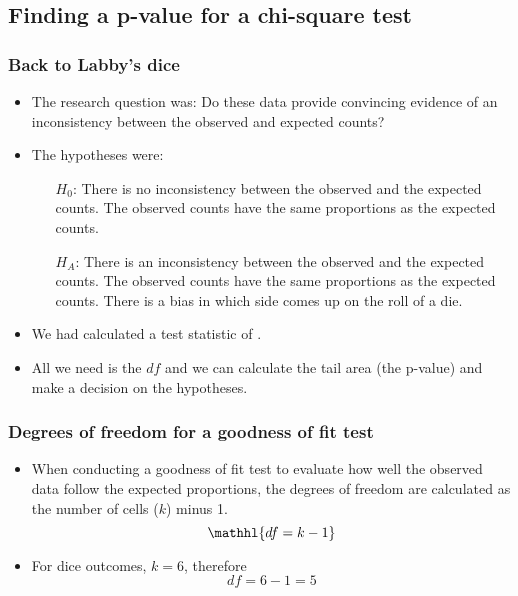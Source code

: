 \documentclass[slidestop,compress,mathserif]{beamer}
\begin{document}

\subsection{Finding a p-value for a chi-square test}


\begin{frame}
\frametitle{Back to Labby's dice}

\begin{itemize}

\item The research question was: Do these data provide convincing evidence of an inconsistency between the observed and expected counts?

\pause

\item The hypotheses were:
\begin{itemize}
\item[$H_0$:] There is no inconsistency between the observed and the expected counts. The observed counts have the same proportions as the expected counts.
\item[$H_A$:] There is an inconsistency between the observed and the expected counts. The observed counts  have the same proportions as the expected counts. There is a bias in which side comes up on the roll of a die.
\end{itemize}

\pause

\item We had calculated a test statistic of .

\pause

\item All we need is the $df$ and we can calculate the tail area (the p-value) and make a decision on the hypotheses.

\end{itemize}

\end{frame}


\begin{frame}
\frametitle{Degrees of freedom for a goodness of fit test}

\begin{itemize}

\item When conducting a goodness of fit test to evaluate how well the observed data follow the expected proportions, the degrees of freedom are calculated as the number of cells ($k$) minus 1.
\[ \mathhl{df = k - 1} \]

\pause

\item For dice outcomes, $k = 6$, therefore
\[ df = 6 - 1 = 5 \]

\end{itemize}

\end{frame}
\end{document}
